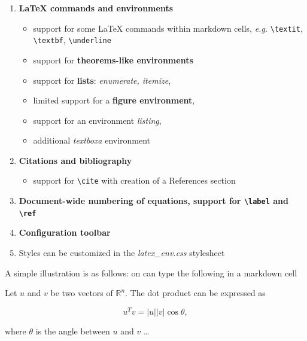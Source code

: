 \begin{enumerate}
\item \textbf{LaTeX commands and environments}

\begin{itemize}
\item support for some LaTeX commands within markdown cells, \emph{e.g.}
\texttt{\textbackslash{}textit}, \texttt{\textbackslash{}textbf},
\texttt{\textbackslash{}underline} \item support for
\textbf{theorems-like environments} \item support for \textbf{lists}:
\emph{enumerate, itemize},\\\item limited support for a \textbf{figure
environment}, \item support for an environment \emph{listing}, \item
additional \emph{textboxa} environment
\end{itemize}

\item \textbf{Citations and bibliography}

\begin{itemize}
\item support for \texttt{\textbackslash{}cite} with creation of a
References section
\end{itemize}

\item \textbf{Document-wide numbering of equations, support for
\texttt{\textbackslash{}label} and \texttt{\textbackslash{}ref}} \item
\textbf{Configuration toolbar} \item Styles can be customized in the
\emph{latex\_env.css} stylesheet
\end{enumerate}

A simple illustration is as follows: on can type the following in a
markdown cell

\begin{listing}
\begin{theorem}
\label{theo:dotp} Let $u$ and $v$ be two vectors of
$\mathbb{R}^n$. The dot product can be expressed as

\begin{equation}
\label{eq:dotp}
u^Tv = |u||v| \cos \theta,
\end{equation}

where $\theta$ is the angle between $u$ and $v$ \ldots{}
\end{theorem}
\end{listing}


